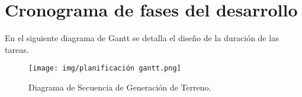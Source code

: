 \section*{Cronograma de fases del desarrollo}

En el siguiente diagrama de Gantt se detalla el diseño de la duración de las tareas.

\begin{figure}[H]
    \centering
    \texttt{[image: img/planificación gantt.png]}
    \caption{Diagrama de Secuencia de Generación de Terreno.}
\end{figure}
